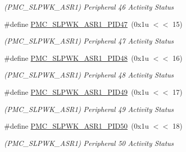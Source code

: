 \begin{DoxyCompactItemize}
\begin{DoxyCompactList}\small\item\em (P\+M\+C\+\_\+\+S\+L\+P\+W\+K\+\_\+\+A\+S\+R1) Peripheral 46 Activity Status \end{DoxyCompactList}\item 
\mbox{\label{group__SAME70__PMC_gafd5500661fca372780b20522df467df9}} 
\#define \mbox{\hyperlink{group__SAME70__PMC_gafd5500661fca372780b20522df467df9}{P\+M\+C\+\_\+\+S\+L\+P\+W\+K\+\_\+\+A\+S\+R1\+\_\+\+P\+I\+D47}}~(0x1u $<$$<$ 15)
\begin{DoxyCompactList}\small\item\em (P\+M\+C\+\_\+\+S\+L\+P\+W\+K\+\_\+\+A\+S\+R1) Peripheral 47 Activity Status \end{DoxyCompactList}\item 
\mbox{\label{group__SAME70__PMC_ga887198bce049df748759d1c3f9041ad3}} 
\#define \mbox{\hyperlink{group__SAME70__PMC_ga887198bce049df748759d1c3f9041ad3}{P\+M\+C\+\_\+\+S\+L\+P\+W\+K\+\_\+\+A\+S\+R1\+\_\+\+P\+I\+D48}}~(0x1u $<$$<$ 16)
\begin{DoxyCompactList}\small\item\em (P\+M\+C\+\_\+\+S\+L\+P\+W\+K\+\_\+\+A\+S\+R1) Peripheral 48 Activity Status \end{DoxyCompactList}\item 
\mbox{\label{group__SAME70__PMC_ga3268f328d48ae9a3b9e16a46614695f1}} 
\#define \mbox{\hyperlink{group__SAME70__PMC_ga3268f328d48ae9a3b9e16a46614695f1}{P\+M\+C\+\_\+\+S\+L\+P\+W\+K\+\_\+\+A\+S\+R1\+\_\+\+P\+I\+D49}}~(0x1u $<$$<$ 17)
\begin{DoxyCompactList}\small\item\em (P\+M\+C\+\_\+\+S\+L\+P\+W\+K\+\_\+\+A\+S\+R1) Peripheral 49 Activity Status \end{DoxyCompactList}\item 
\mbox{\label{group__SAME70__PMC_ga2d2d99e2b2bfd6f7d495d9117a5104a4}} 
\#define \mbox{\hyperlink{group__SAME70__PMC_ga2d2d99e2b2bfd6f7d495d9117a5104a4}{P\+M\+C\+\_\+\+S\+L\+P\+W\+K\+\_\+\+A\+S\+R1\+\_\+\+P\+I\+D50}}~(0x1u $<$$<$ 18)
\begin{DoxyCompactList}\small\item\em (P\+M\+C\+\_\+\+S\+L\+P\+W\+K\+\_\+\+A\+S\+R1) Peripheral 50 Activity Status \end{DoxyCompactList}\item 

\end{DoxyCompactItemize}
